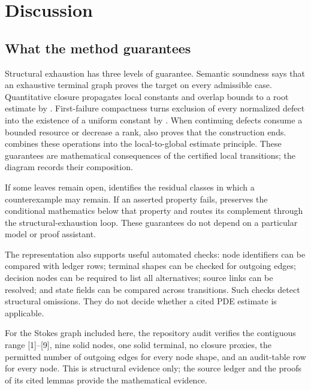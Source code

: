 \documentclass[11pt,reqno]{amsart}
\theoremstyle{plain}
\theoremstyle{definition}
\theoremstyle{remark}
\numberwithin{equation}{section}
\begin{document}
\section{Discussion}
\label{sec:discussion}

\subsection{What the method guarantees}

Structural exhaustion has three levels of guarantee.  Semantic soundness says
that an exhaustive terminal graph proves the target on every admissible case.
Quantitative closure propagates local constants and overlap bounds to a root
estimate by .  First-failure compactness turns
exclusion of every normalized defect into the existence of a uniform constant
by .  When continuing defects consume a
bounded resource or decrease a rank,  also
proves that the construction ends.  
combines these operations into the local-to-global estimate principle.  These guarantees are mathematical
consequences of the certified local transitions; the diagram records their
composition.

If some leaves remain open,  identifies the residual classes
in which a counterexample may remain.  If an asserted property fails,
 preserves the conditional mathematics below that property and
routes its complement through the structural-exhaustion loop.  These guarantees
do not depend on a particular model or proof assistant.

The representation also supports useful automated checks: node identifiers can
be compared with ledger rows; terminal shapes can be checked for outgoing
edges; decision nodes can be required to list all alternatives; source links
can be resolved; and state fields can be compared across transitions.  Such
checks detect structural omissions.  They do not decide whether a cited PDE
estimate is applicable.

For the Stokes graph included here, the repository audit verifies the contiguous
range [1]--[9], nine solid nodes, one solid terminal, no closure proxies, the
permitted number of outgoing edges for every node shape, and an audit-table row
for every node.  This is structural evidence only; the source ledger and the
proofs of its cited lemmas provide the mathematical evidence.
\end{document}
